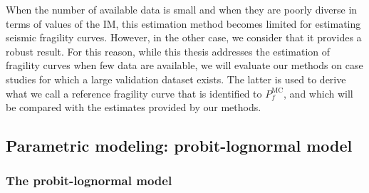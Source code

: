 When the number of available data is small and when they are poorly diverse in terms of values of the IM, this estimation method becomes limited for estimating seismic fragility curves. However, in the other case, we consider that it provides a robust result. %
For this reason, while this thesis addresses the estimation of fragility curves when few data are available, we will evaluate our methods on case studies for which a large validation dataset exists.
The latter is used to derive what we call a reference fragility curve that is identified to $P^{\text{MC}}_f$, and which will be compared with the estimates provided by our methods.










\subsection{Parametric modeling: probit-lognormal model}\label{sec:intro-frags:subsec-parametric}

\subsubsection{The probit-lognormal model}


